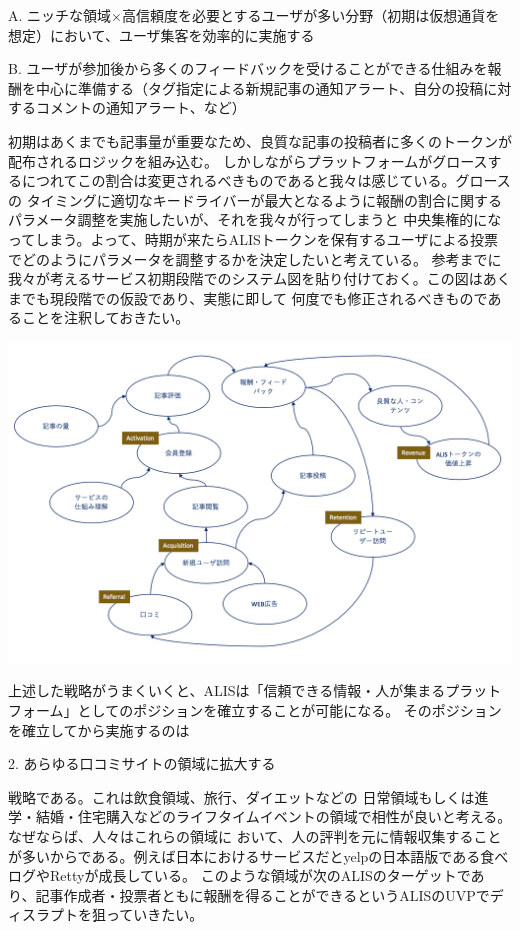 \documentclass{jsarticle}
\begin{document}
A. ニッチな領域×高信頼度を必要とするユーザが多い分野（初期は仮想通貨を想定）において、ユーザ集客を効率的に実施する

B. ユーザが参加後から多くのフィードバックを受けることができる仕組みを報酬を中心に準備する（タグ指定による新規記事の通知アラート、自分の投稿に対するコメントの通知アラート、など）

初期はあくまでも記事量が重要なため、良質な記事の投稿者に多くのトークンが配布されるロジックを組み込む。
しかしながらプラットフォームがグロースするにつれてこの割合は変更されるべきものであると我々は感じている。グロースの
タイミングに適切なキードライバーが最大となるように報酬の割合に関するパラメータ調整を実施したいが、それを我々が行ってしまうと
中央集権的になってしまう。よって、時期が来たらALISトークンを保有するユーザによる投票でどのようにパラメータを調整するかを決定したいと考えている。
参考までに我々が考えるサービス初期段階でのシステム図を貼り付けておく。この図はあくまでも現段階での仮設であり、実態に即して
何度でも修正されるべきものであることを注釈しておきたい。

\begin{center}
	\includegraphics[scale=0.6]{img/systemthinking-with-AARRR.png}
\end{center}

上述した戦略がうまくいくと、ALISは「信頼できる情報・人が集まるプラットフォーム」としてのポジションを確立することが可能になる。
そのポジションを確立してから実施するのは

2. あらゆる口コミサイトの領域に拡大する

戦略である。これは飲食領域、旅行、ダイエットなどの
日常領域もしくは進学・結婚・住宅購入などのライフタイムイベントの領域で相性が良いと考える。なぜならば、人々はこれらの領域に
おいて、人の評判を元に情報収集することが多いからである。例えば日本におけるサービスだとyelpの日本語版である食べログやRettyが成長している。
このような領域が次のALISのターゲットであり、記事作成者・投票者ともに報酬を得ることができるというALISのUVPでディスラプトを狙っていきたい。
\end{document}
